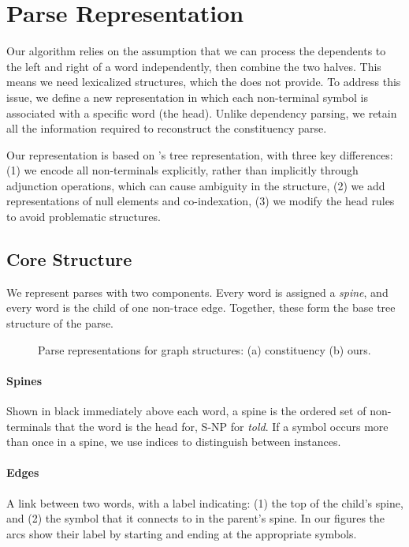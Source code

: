 \section{Parse Representation} \label{sec:representation}

Our algorithm relies on the assumption that we can process the dependents to the left and right of a word independently, then combine the two halves.
This means we need lexicalized structures, which the \ptb does not provide.
To address this issue, we define a new representation in which each non-terminal symbol is associated with a specific word (the head).
Unlike dependency parsing, we retain all the information required to reconstruct the constituency parse.

Our representation is based on \textcite{cck}'s tree representation, with three key differences:
(1) we encode all non-terminals explicitly, rather than implicitly through adjunction operations, which can cause ambiguity in the structure,
(2) we add representations of null elements and co-indexation,
(3) we modify the head rules to avoid problematic structures.

\subsection{Core Structure} \label{sec:rep-core}

We represent parses with two components.
Every word is assigned a \emph{spine}, and every word is the child of one non-trace edge.
Together, these form the base tree structure of the parse.


\begin{figure}
  \centering
  \scalebox{1.0}{
    
  }
  \caption[Parse representations for graph structures.]{ \label{fig:repr2}
    Parse representations for graph structures: (a) constituency (b) ours.
  }
\end{figure}

\paragraph{Spines}
Shown in black immediately above each word, a spine is the ordered set of non-terminals that the word is the head for, \myeg S-NP for \emph{told}.
If a symbol occurs more than once in a spine, we use indices to distinguish between instances.

\paragraph{Edges}
A link between two words, with a label indicating: (1) the top of the child's spine, and (2) the symbol that it connects to in the parent's spine.
In our figures the arcs show their label by starting and ending at the appropriate symbols.

